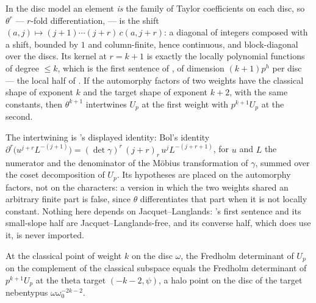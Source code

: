 \begin{proposition}
  \label{prop:theta}
  \leanok
  In the disc model an element \emph{is} the family of Taylor coefficients on each disc, so
  $\theta^{r}$ --- $r$-fold differentiation, \cite[\S7]{Bu04} --- is the shift
  $(a,j)\mapsto (j+1)\cdots(j+r)\,c(a,j+r)$: a diagonal of integers composed with a shift,
  bounded by $1$ and column-finite, hence continuous, and block-diagonal over the discs.  Its
  kernel at $r = k+1$ is exactly the locally polynomial functions of degree $\leq k$, which is
  the first sentence of \cite[Proposition 4]{Bu04}, of dimension $(k+1)p^{h}$ per disc --- the
  local half of \cite[(3.21.1)]{LWX}.  If the automorphy factors of two weights have the classical
  shape of exponent $k$ and the target shape of exponent $k+2$, with the same constants, then
  $\theta^{k+1}$ intertwines $U_p$ at the first weight with $p^{k+1}U_p$ at the second.
\end{proposition}

The intertwining is \cite[\S7]{Bu04}'s displayed identity: Bol's identity
$\partial^{r}\bigl(u^{j+r}L^{-(j+1)}\bigr) = (\det\gamma)^{r}\,(j+r)_{r}\,u^{j}L^{-(j+r+1)}$, for
$u$ and $L$ the numerator and the denominator of the M\"obius transformation of $\gamma$, summed
over the coset decomposition of $U_p$.  Its hypotheses are placed on the automorphy factors, not on
the characters: a version in which the two weights shared an arbitrary finite part is false, since
$\theta$ differentiates that part when it is not locally constant.  Nothing here depends on
Jacquet--Langlands: \cite[Proposition 4]{Bu04}'s first sentence and its small-slope half are
Jacquet--Langlands-free, and its converse half, which does use it, is never imported.

\begin{proposition}
  \label{prop:theta-exact}
  \leanok
  At the classical point of weight $k$ on the disc $\omega$, the Fredholm determinant of $U_p$ on
  the complement of the classical subspace equals the Fredholm determinant of $p^{k+1}U_p$ at the
  theta target $(-k-2,\psi)$, a halo point on the disc of the target nebentypus
  $\omega\omega_0^{-2k-2}$.
\end{proposition}

